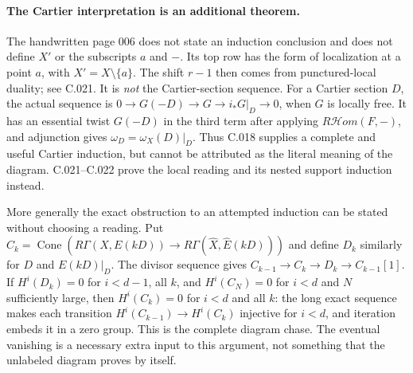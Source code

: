 \paragraph{The Cartier interpretation is an additional theorem.}
The handwritten page 006 does not state an induction conclusion and
does not define $X'$ or the subscripts $a$ and $-$. Its top row has
the form of localization at a point $a$, with $X'=X\setminus\{a\}$.
The shift $r-1$ then comes from punctured-local duality; see C.021.
It is \emph{not} the Cartier-section sequence. For a Cartier section
$D$, the actual sequence is
$0\to G(-D)\to G\to i_*G|_D\to0$, when $G$ is locally free.
It has an essential twist $G(-D)$ in the third term after applying
$R\mathcal Hom(F,-)$, and adjunction gives
$\omega_D=\omega_X(D)|_D$. Thus C.018 supplies a complete and useful
Cartier induction, but cannot be attributed as the literal meaning
of the diagram. C.021--C.022 prove the local reading and its nested
support induction instead.

More generally the exact obstruction to an attempted induction can
be stated without choosing a reading. Put
$C_k=\operatorname{Cone}(R\Gamma(X,E(kD))\to
R\Gamma(\widehat X,\widehat E(kD)))$ and define $D_k$ similarly for
$D$ and $E(kD)|_D$. The divisor sequence gives
$C_{k-1}\to C_k\to D_k\to C_{k-1}[1]$.
If $H^i(D_k)=0$ for $i<d-1$, all $k$, and $H^i(C_N)=0$ for
$i<d$ and $N$ sufficiently large, then $H^i(C_k)=0$ for $i<d$
and all $k$: the long exact sequence makes each transition
$H^i(C_{k-1})\to H^i(C_k)$ injective for $i<d$, and iteration
embeds it in a zero group. This is the complete diagram chase.
The eventual vanishing is a necessary extra input to this argument,
not something that the unlabeled diagram proves by itself.

